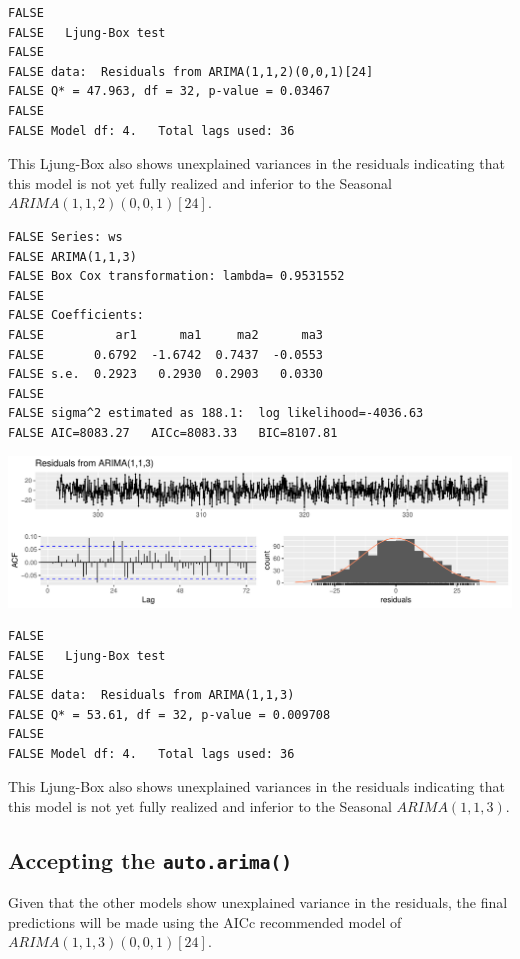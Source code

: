 \documentclass[openany]{book}
\begin{document}
\begin{verbatim}
FALSE 
FALSE   Ljung-Box test
FALSE 
FALSE data:  Residuals from ARIMA(1,1,2)(0,0,1)[24]
FALSE Q* = 47.963, df = 32, p-value = 0.03467
FALSE 
FALSE Model df: 4.   Total lags used: 36
\end{verbatim}

This Ljung-Box also shows unexplained variances in the residuals
indicating that this model is not yet fully realized and inferior to the
Seasonal \(ARIMA (1,1,2)(0,0,1)[24]\).

\begin{verbatim}
FALSE Series: ws 
FALSE ARIMA(1,1,3) 
FALSE Box Cox transformation: lambda= 0.9531552 
FALSE 
FALSE Coefficients:
FALSE          ar1      ma1     ma2      ma3
FALSE       0.6792  -1.6742  0.7437  -0.0553
FALSE s.e.  0.2923   0.2930  0.2903   0.0330
FALSE 
FALSE sigma^2 estimated as 188.1:  log likelihood=-4036.63
FALSE AIC=8083.27   AICc=8083.33   BIC=8107.81
\end{verbatim}

\includegraphics{Part-C-BP_files/figure-latex/unnamed-chunk-13-1.pdf}

\begin{verbatim}
FALSE 
FALSE   Ljung-Box test
FALSE 
FALSE data:  Residuals from ARIMA(1,1,3)
FALSE Q* = 53.61, df = 32, p-value = 0.009708
FALSE 
FALSE Model df: 4.   Total lags used: 36
\end{verbatim}

This Ljung-Box also shows unexplained variances in the residuals
indicating that this model is not yet fully realized and inferior to the
Seasonal \(ARIMA (1,1,3)\).

\hypertarget{accepting-the-auto.arima}{%
\subsection{\texorpdfstring{Accepting the
\texttt{auto.arima()}}{Accepting the auto.arima()}}\label{accepting-the-auto.arima}}

Given that the other models show unexplained variance in the residuals,
the final predictions will be made using the AICc recommended model of
\(ARIMA (1,1,3)(0,0,1)[24]\).
\end{document}
